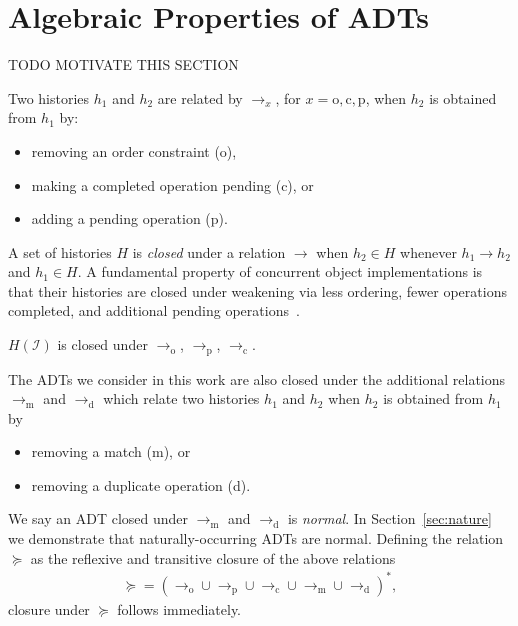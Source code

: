 \section{Algebraic Properties of ADTs}
\label{sec:algebra}

TODO MOTIVATE THIS SECTION

Two histories $h_1$ and $h_2$ are related by $\to_x$, for $x = \mathrm{o},
\mathrm{c}, \mathrm{p}$, when $h_2$ is obtained from $h_1$ by:
\begin{itemize}

  \item removing an order constraint (o),

  \item making a completed operation pending (c), or

  \item adding a pending operation (p).

\end{itemize}
A set of histories $H$ is \emph{closed} under a relation $\to$ when $h_2 \in H$
whenever $h_1 \to h_2$ and $h_1 \in H$. A fundamental property of concurrent
object implementations is that their histories are closed under weakening via
less ordering, fewer operations completed, and additional pending
operations~\cite{conf/popl/BouajjaniEEH15}.

\begin{lemma}

  $H(\mathcal{I})$ is closed under $\to_\mathrm{o}$, $\to_\mathrm{p}$, 
  $\to_\mathrm{c}$.

\end{lemma}

The ADTs we consider in this work are also closed under the additional
relations $\to_\mathrm{m}$ and $\to_\mathrm{d}$ which relate two histories
$h_1$ and $h_2$ when $h_2$ is obtained from $h_1$ by
\begin{itemize}

  \item removing a match (m), or

  \item removing a duplicate operation (d).

\end{itemize}
We say an ADT closed under $\to_\mathrm{m}$ and $\to_\mathrm{d}$ is
\emph{normal}. In Section~\ref{sec:nature} we demonstrate that
naturally-occurring ADTs are normal. Defining the relation $\succeq$ as the
reflexive and transitive closure of the above relations
\begin{align*}
  \succeq = (\to_\mathrm{o} \cup \to_\mathrm{p} \cup \to_\mathrm{c} \cup 
  \to_\mathrm{m} \cup \to_\mathrm{d})^\ast,
\end{align*}
closure under $\succeq$ follows immediately.

